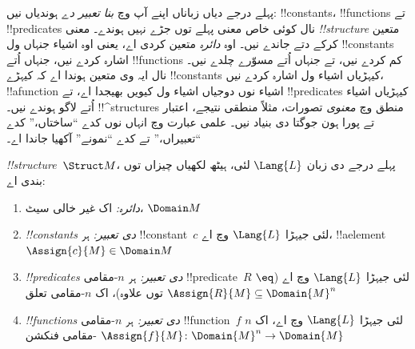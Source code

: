 \documentclass[../../../include/open-logic-section]{subfiles}
\begin{document}


\begin{explain}
پہلے درجے دیاں زباناں اپنے آپ وچ \emph{بنا تعبیر دے} ہوندیاں نیں:
!!{constant}s، !!{function}s تے !!{predicate}s نال کوئی خاص
معنی پہلے توں جڑے نہیں ہوندے۔ معنی 
\emph{!!{structure}} متعین کرکے دتے جاندے نیں۔ اوہ
\emph{دائرہ} متعین کردی اے، یعنی اوہ اشیاء جنہاں ول
!!{constant}s اشارہ کردے نیں، جنہاں اُتے !!{function}s کم کردے
نیں، تے جنہاں اُتے مسوّرے چلدے نیں۔ نال ایہ وی متعین ہوندا اے
کہ کیہڑے !!{constant}s کیہڑیاں اشیاء ول اشارہ کردے نیں،
!!a{function} اشیاء نوں دوجیاں اشیاء ول کیویں بھیجدا اے، تے
!!{predicate}s کیہڑیاں اشیاء اُتے لاگو ہوندے نیں۔
!!^{structure}s منطق وچ \emph{معنوی} تصورات، مثلاً منطقی نتیجے،
اعتبار تے پورا ہون جوگتا دی بنیاد نیں۔ علمی عبارت وچ انہاں نوں
کدے ``ساختاں،'' کدے ``تعبیراں،'' تے کدے ``نمونے'' آکھیا جاندا اے۔
\end{explain}

\begin{defn}[!!^{structure}s]
 \emph{!!{structure}}~$\Struct M$، پہلے درجے دی
زبان $\Lang{L}$ لئی، ہیٹھ لکھیاں چیزاں توں بندی اے:
\begin{enumerate}
\item \emph{دائرہ:} اک غیر خالی سیٹ، $\Domain M$
\item \emph{!!{constant}s دی تعبیر:} ہر !!{constant}~$c$ لئی
  جیہڑا $\Lang{L}$ وچ اے، !!a{element} $\Assign{c}{M} \in \Domain M$
\item \emph{!!{predicate}s دی تعبیر:} ہر $n$-مقامی
  !!{predicate}~$R$ لئی جیہڑا $\Lang{L}$ وچ اے ($\eq$ توں علاوہ)، اک $n$-مقامی
  تعلق $\Assign{R}{M} \subseteq \Domain{M}^n$
\item \emph{!!{function}s دی تعبیر:} ہر $n$-مقامی
  !!{function}~$f$ لئی جیہڑا $\Lang{L}$ وچ اے، اک $n$-مقامی فنکشن $\Assign{f}{M}
  \colon \Domain{M}^n \to \Domain{M}$
\end{enumerate}
\end{defn}
\end{document}
